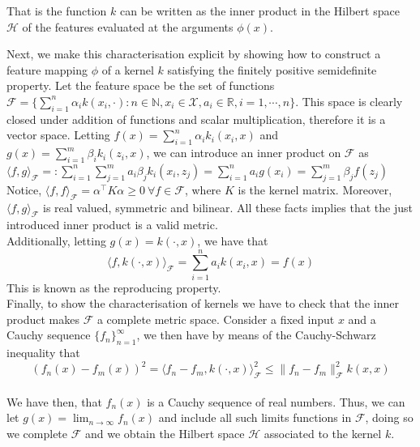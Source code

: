 That is the function $k$ can be written as the inner product in the Hilbert space $\mathcal{H}$ of the features evaluated at the arguments $\phi(x)$.

Next, we make this characterisation explicit by showing how to construct a feature mapping $\phi$ of a kernel $k$ satisfying the finitely positive semidefinite property.
Let the feature space be the set of functions 
\\
$\mathcal{F} =\{ \sum\limits_{i=1}^n \alpha_i k(x_i, \cdot): n \in \mathbb{N}, x_i \in \mathcal{X}, a_i \in \mathbb{R}, i=1,\cdots, n\}$.
This space is clearly closed under addition of functions and scalar multiplication, therefore it is a vector space.
Letting $f(x)=\sum\limits_{i=1}^n \alpha_i k_i(x_i,x)$ and $g(x)=\sum\limits_{i=1}^m \beta_i k_i(z_i,x)$,  we can introduce an inner product on $\mathcal{F}$ as 
\\
$\langle f,g \rangle_{\mathcal{F}}=:\sum\limits_{i=1}^n\sum\limits_{j=1}^m a_i \beta_j k_i(x_i,z_j)=\sum\limits_{i=1}^n a_i g(x_i)= \sum\limits_{j=1}^m \beta_j f(z_j)$
\\
Notice, $\langle f, f \rangle_{\mathcal{F}}= \alpha^\intercal K \alpha \geq 0 \ \forall f \in \mathcal{F}$, where $K$ is the kernel matrix.
Moreover, $\langle f, g \rangle_{\mathcal{F}}$ is real valued, symmetric and bilinear. All these facts implies that the just introduced inner product is a valid metric.
\\
Additionally, letting $g(x)=k(\cdot, x)$, we have that 
\begin{equation}
    \langle f, k(\cdot, x)\rangle_{\mathcal{F}}=\sum\limits_{i=1}^n a_i k(x_i,x)=f(x)    
\end{equation}
This is known as the reproducing property.
\\
Finally, to show the characterisation of kernels we have to check that the inner product makes $\mathcal{F}$ a complete metric space.
Consider a fixed input $x$ and a Cauchy sequence $\{f_n\}_{n=1}^{\infty}$, we then have by means of the Cauchy-Schwarz inequality that 
\\
\begin{equation}
    (f_n(x)- f_m(x))^2=\langle f_n-f_m, k(\cdot, x)\rangle_{\mathcal{F}}^2 \leq \| f_n - f_m \|_{\mathcal{F}}^2 k(x,x)    
\end{equation}
\\
We have then, that $f_n(x)$ is a Cauchy sequence of real numbers. Thus, we can let $g(x)=\lim_{n\to \infty} f_n(x)$ and include all such limits functions in $\mathcal{F}$, doing so we complete $\mathcal{F}$ and we obtain the Hilbert space $\mathcal{H}$ associated to the kernel $k$.

